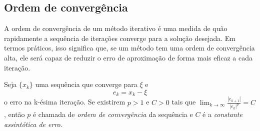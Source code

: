 
\subsection{Ordem de convergência}

A ordem de convergência de um método iterativo é uma medida de quão rapidamente a sequência de iterações converge para a solução desejada. Em termos práticos, isso significa que, se um método tem uma ordem de convergência alta, ele será capaz de reduzir o erro de aproximação de forma mais eficaz a cada iteração.
\begin{df}
    Seja $\{x_k\}$ uma sequência que converge para $\xi$ e
    \begin{equation} \label{erro}
        e_k = x_k - \xi
    \end{equation}
    o erro na k-ésima iteração.
    Se existirem $p > 1$ e $C > 0$ tais que $\lim_{k \to \infty} \frac{|e_{k+1}|}{|e_k|^p} = C$, então $p$ é chamada de \emph{ordem de convergência} da sequência e $C$ é a \emph{constante assintótica de erro}.
\end{df}

